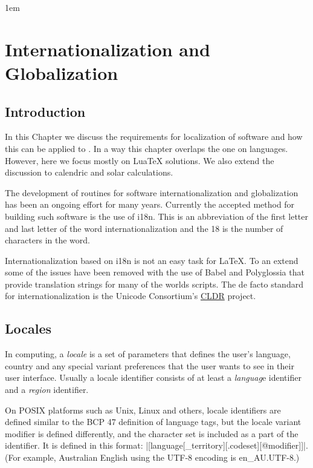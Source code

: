 
 
\parindent1em

\chapter{Internationalization and Globalization}

\section{Introduction}

In this Chapter we discuss the requirements for localization of software and how this can be applied to \latex. In a way this chapter overlaps the one on languages. However, here we focus mostly on LuaTeX solutions. We also extend the discussion to calendric and solar calculations.

The development of routines for software internationalization and globalization has been an ongoing effort for many years. Currently the accepted method for building such software is the use of i18n. This is an abbreviation of the first letter and last letter of the word internationalization and the 18 is the number of characters in the word.

Internationalization based on i18n is not an easy task for \LaTeX. To an extend some of the issues have been removed with the use of Babel and Polyglossia that provide translation strings for many of the worlds scripts. The de facto standard for internationalization is the Unicode Consortium’s \href{http://cldr.unicode.org/}{CLDR} project.

\section{Locales}

In computing, a \emph{locale} is a set of parameters that defines the user's language, country and any special variant preferences that the user wants to see in their user interface. Usually a locale identifier consists of at least a \textit{languag}e identifier and a \textit{region} identifier.

On POSIX platforms such as Unix, Linux and others, locale identifiers are defined similar to the BCP 47 definition of language tags, but the locale variant modifier is defined differently, and the character set is included as a part of the identifier. It is defined in this format: |[language[_territory][.codeset][@modifier]]|. (For example, Australian English using the UTF-8 encoding is en\_AU.UTF-8.)


